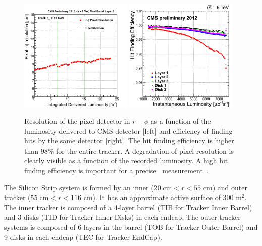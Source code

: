 \begin{figure}[!Hhtbp]
  \begin{center}
    \includegraphics[width=0.48\textwidth]{figs/PXB2_residuals.png}
    \includegraphics[width=0.48\textwidth]{figs/HitEff_vs_InstLumi.png}
    \caption{Resolution of the pixel detector in $r-\phi$ as a function of the luminosity delivered to CMS detector [left] and efficiency of finding hits by the same detector [right]. The hit finding efficiency is higher than 98\% for the entire tracker. A degradation of pixel resolution is clearly visible as a function of the recorded luminosity. A high hit finding efficiency is important for a precise \pt~measurement~\cite{Brochet:1956723}.}
    \label{fig:pixelresolution}
  \end{center}
\end{figure}

The Silicon Strip system is formed by an inner ($20\;\text{cm} < r < 55$ cm) and outer tracker ($55\;\text{cm} < r < 116$ cm). It has an approximate active surface of 300 $\text{m}^{2}$. The inner tracker is composed of a 4-layer barrel (TIB for Tracker Inner Barrel) and 3 disks (TID for Tracker Inner Disks) in each endcap. The outer tracker systems is composed of 6 layers in the barrel (TOB for Tracker Outer Barrel) and 9 disks in each endcap (TEC for Tracker EndCap).

